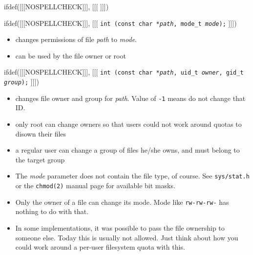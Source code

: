 
ifdef([[[NOSPELLCHECK]]], [[[
]]])

\begin{slide}
ifdef([[[NOSPELLCHECK]]], [[[
\texttt{int (const char *\emph{path}, mode\_t \emph{mode});}
]]])
\begin{itemize}
\item changes permissions of file \emph{path} to \emph{mode}.
\item can be used by the file owner or root
\end{itemize}
ifdef([[[NOSPELLCHECK]]], [[[
\texttt{int (const char *\emph{path}, uid\_t \emph{owner},
gid\_t \emph{group});}
]]])
\begin{itemize}
\item changes file owner and group for \emph{path}.  Value of
\texttt{-1} means do not change that ID.
\item only root can change owners so that users could not work around quotas
to disown their files
\item a regular user can change a group of files he/she owns, and must belong to
the target group
\end{itemize}
\end{slide}

\begin{itemize}
\item The \emph{mode} parameter does not contain the file type, of course.  See
\texttt{sys/stat.h} or the \texttt{chmod(2)} manual page for available bit
masks.
\item Only the owner of a file can change its mode.  Mode like
\texttt{rw-rw-rw-} has nothing to do with that.
\item In some implementations, it was possible to pass the file ownership to
someone else.  Today this is usually not allowed.  Just think about how you
could work around a per-user filesystem quota with this.
\end{itemize}

\endinput
